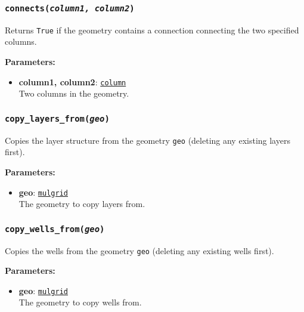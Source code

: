 \begin{snugshade}\subsubsection{\texttt{connects(\emph{column1, column2})}}\end{snugshade}
\label{sec:mulgrid:connects}

Returns \texttt{True} if the geometry contains a connection connecting the two specified columns.

\textbf{Parameters:}
\begin{itemize}
\item \textbf{column1, column2}: \hyperref[columnobjects]{\texttt{column}}\\
  Two columns in the geometry.
\end{itemize}

\begin{snugshade}\subsubsection{\texttt{copy\_layers\_from(\emph{geo})}}\end{snugshade}
\label{sec:mulgrid:copy_layers_from}

Copies the layer structure from the geometry \texttt{geo} (deleting any existing layers first).

\textbf{Parameters:}
\begin{itemize}
\item \textbf{geo}: \hyperref[mulgrids]{\texttt{mulgrid}}\\
  The geometry to copy layers from.
\end{itemize}

\begin{snugshade}\subsubsection{\texttt{copy\_wells\_from(\emph{geo})}}\end{snugshade}
\label{sec:mulgrid:copy_wells_from}

Copies the wells from the geometry \texttt{geo} (deleting any existing wells first).

\textbf{Parameters:}
\begin{itemize}
\item \textbf{geo}: \hyperref[mulgrids]{\texttt{mulgrid}}\\
  The geometry to copy wells from.
\end{itemize}

